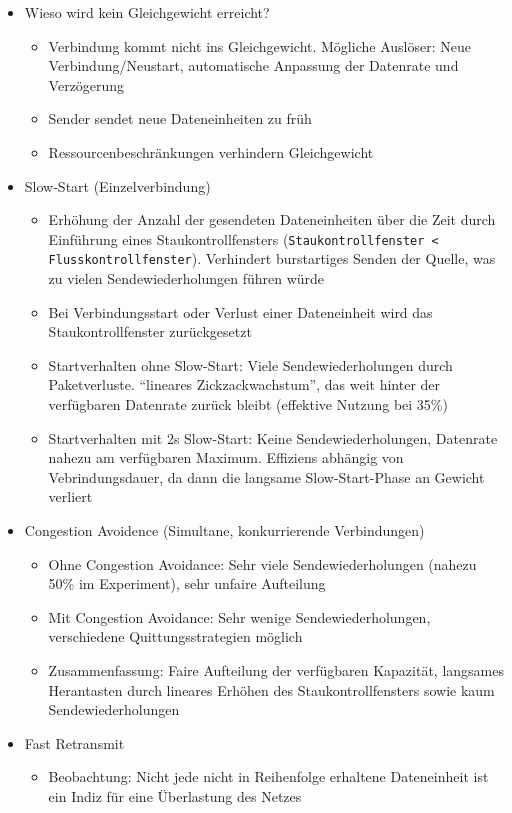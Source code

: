 \begin{itemize}
\begin{itemize}
		\item Wieso wird kein Gleichgewicht erreicht?
		\begin{itemize}
			\item Verbindung kommt nicht ins Gleichgewicht. Mögliche Auslöser: Neue Verbindung/Neustart, automatische Anpassung der Datenrate und Verzögerung
			\item Sender sendet neue Dateneinheiten zu früh
			\item Ressourcenbeschränkungen verhindern Gleichgewicht
		\end{itemize}
		\item Slow-Start (Einzelverbindung)
		\begin{itemize}
			\item Erhöhung der Anzahl der gesendeten Dateneinheiten über die Zeit durch Einführung eines Staukontrollfensters (\texttt{Staukontrollfenster < Flusskontrollfenster}). Verhindert burstartiges Senden der Quelle, was zu vielen Sendewiederholungen führen würde
			\item Bei Verbindungsstart oder Verlust einer Dateneinheit wird das Staukontrollfenster zurückgesetzt
			\item Startverhalten ohne Slow-Start: Viele Sendewiederholungen durch Paketverluste. "`lineares Zickzackwachstum"', das weit hinter der verfügbaren Datenrate zurück bleibt (effektive Nutzung bei 35\%)
			\item Startverhalten mit 2s Slow-Start: Keine Sendewiederholungen, Datenrate nahezu am verfügbaren Maximum. Effiziens abhängig von Vebrindungsdauer, da dann die langsame Slow-Start-Phase an Gewicht verliert
		\end{itemize}
		\item Congestion Avoidence (Simultane, konkurrierende Verbindungen)
		\begin{itemize}
			\item Ohne Congestion Avoidance: Sehr viele Sendewiederholungen (nahezu 50\% im Experiment), sehr unfaire Aufteilung
			\item Mit Congestion Avoidance: Sehr wenige Sendewiederholungen, verschiedene Quittungsstrategien möglich
			\item Zusammenfassung: Faire Aufteilung der verfügbaren Kapazität, langsames Herantasten durch lineares Erhöhen des Staukontrollfensters sowie kaum Sendewiederholungen
		\end{itemize}
		\item Fast Retransmit
		\begin{itemize}
			\item Beobachtung: Nicht jede nicht in Reihenfolge erhaltene Dateneinheit ist ein Indiz für eine Überlastung des Netzes

\end{itemize}
\end{itemize}
\end{itemize}
